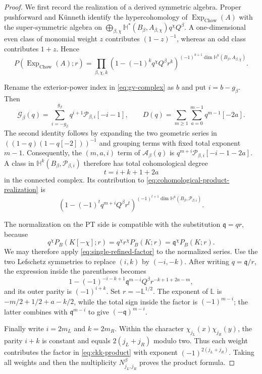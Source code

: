 \documentclass[11pt,reqno]{amsart}
\theoremstyle{definition}
\newcommand{\ExpChow}{\operatorname{Exp}_{\mathrm{Chow}}}
\begin{document}
\begin{proof}
We first record the realization of a derived symmetric algebra.  Proper
pushforward and K\"unneth identify the hypercohomology of $\ExpChow(A)$ with
the super-symmetric algebra on
$\bigoplus_{\beta,\chi}\mathbb H^*(B_\beta,A_{\beta,\chi})q^\chi Q^\beta$.
A one-dimensional even class of monomial weight $z$ contributes
$(1-z)^{-1}$, whereas an odd class contributes $1+z$.  Hence
\begin{equation}\label{eq:cohomological-product-realization}
 P(\ExpChow(A);r)
 =\prod_{\beta,\chi,k}
 \left(1-(-1)^kq^\chi Q^\beta r^k\right)^{
 (-1)^{k+1}\dim\mathbb H^k(B_\beta,A_{\beta,\chi})}.
\end{equation}

Rename the exterior-power index in \eqref{eq:gv-complex} as $b$ and put
$i=b-g_\beta$.  Then
\begin{equation}\label{eq:connected-refined-expansion}
 \mathcal G_\beta(q)
 =\sum_{i=-g_\beta}^{g_\beta}
 q^{i+1}\mathcal P_{\beta,i}[-i-1],
 \qquad
 D(q)=\sum_{m\ge1}\sum_{a=0}^{m-1}q^{m-1}[-2a].
\end{equation}
The second identity follows by expanding the two geometric series in
$((1-q)(1-q[-2]))^{-1}$ and grouping terms with fixed total exponent
$m-1$.  Consequently, the $(m,a,i)$ term of $\mathcal A_\beta(q)$ is
$q^{m+i}\mathcal P_{\beta,i}[-i-1-2a]$.  A class in
$\mathbb H^k(B_\beta,\mathcal P_{\beta,i})$ therefore has total
cohomological degree
\[
 t=i+k+1+2a
\]
in the connected complex.  Its contribution to
\eqref{eq:cohomological-product-realization} is
\begin{equation}\label{eq:single-refined-factor}
 \left(1-(-1)^tq^{m+i}Q^\beta r^t\right)^{
 (-1)^{t+1}\dim\mathbb H^k(B_\beta,\mathcal P_{\beta,i})}.
\end{equation}

The normalization on the PT side is compatible with the substitution
$\mathfrak q=qr$, because
\[
 q^\chi P_B(K[-\chi];r)
 =q^\chi r^\chi P_B(K;r)
 =\mathfrak q^\chi P_B(K;r).
\]
We may therefore
apply \eqref{eq:single-refined-factor} to the normalized series.
Use the two Lefschetz symmetries to replace $(i,k)$ by $(-i,-k)$.
After writing $q=\mathfrak q/r$, the expression inside the parentheses
becomes
\[
 1-(-1)^{-i-k+1}\mathfrak q^{m-i}Q^\beta
 r^{-k+1+2a-m},
\]
and its outer parity is $(-1)^{i+k}$.  Set
$r=-\mathbb L^{1/2}$.  The exponent of $\mathbb L$ is
$-m/2+1/2+a-k/2$, while the total sign inside the factor is
$(-1)^{m-i}$; the latter combines with $\mathfrak q^{m-i}$ to give
$(-\mathfrak q)^{m-i}$.

Finally write $i=2m_L$ and $k=2m_R$.  Within the character
$\chi_{j_L}(x)\chi_{j_R}(y)$, the parity $i+k$ is constant and equals
$2(j_L+j_R)$ modulo two.  Thus each weight contributes the factor in
\eqref{eq:ckk-product} with exponent $(-1)^{2(j_L+j_R)}$.  Taking all
weights and then the multiplicity $N^\beta_{j_L,j_R}$ proves the product
formula.
\end{proof}
\end{document}
